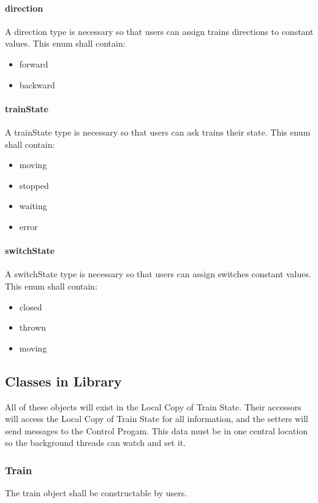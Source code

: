 \documentclass[a4paper,11pt,notitlepage]{article}
\def\CS{Control Progam\xspace} \def\LC{Local Copy of Train State\xspace} \def\TN{Track Node\xspace}
\begin{document}
\paragraph{direction} A direction type is necessary so that users can assign trains directions to constant values. This enum shall contain:
\begin{itemize}
\item forward
\item backward
\end{itemize}
\paragraph{trainState} A trainState type is necessary so that users can ask trains their state. This enum shall contain:
\begin{itemize}
\item moving
\item stopped
\item waiting
\item error
\end{itemize}
\paragraph{switchState} A switchState type is necessary so that users can assign switches constant values. This enum shall contain:
\begin{itemize}
\item closed
\item thrown
\item moving
\end{itemize}
\subsection{Classes in Library}
All of these objects will exist in the \LC. Their accessors will access the \LC for all information, and the setters will send messages to the \CS. This data must be in one central location so the background threads can watch and set it.
\subsubsection{Train}
The train object shall be constructable by users.
\end{document}
